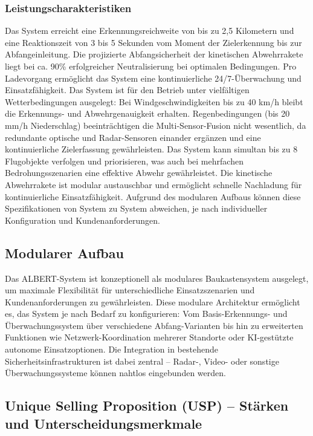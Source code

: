 \documentclass[11pt,a4paper]{article}
\begin{document}
\subsubsection*{Leistungscharakteristiken}
Das System erreicht eine Erkennungsreichweite von bis zu 2,5 Kilometern und eine Reaktionszeit von 3 bis 5 
Sekunden vom Moment der Zielerkennung bis zur Abfangeinleitung. Die projizierte Abfangsicherheit der kinetischen 
Abwehrrakete liegt bei ca. 90\% erfolgreicher Neutralisierung bei optimalen Bedingungen. Pro Ladevorgang ermöglicht 
das System eine kontinuierliche 24/7-Überwachung und Einsatzfähigkeit. Das System ist für den Betrieb 
unter vielfältigen Wetterbedingungen ausgelegt: Bei Windgeschwindigkeiten bis zu 40 km/h bleibt die Erkennungs- 
und Abwehrgenauigkeit erhalten. Regenbedingungen (bis 20 mm/h Niederschlag) beeinträchtigen die Multi-Sensor-Fusion 
nicht wesentlich, da redundante optische und Radar-Sensoren einander ergänzen und eine kontinuierliche Zielerfassung 
gewährleisten.
Das System kann simultan bis zu 8 Flugobjekte verfolgen und priorisieren, was auch bei mehrfachen 
Bedrohungsszenarien eine effektive Abwehr gewährleistet. Die kinetische Abwehrrakete ist modular austauschbar 
und ermöglicht schnelle Nachladung für kontinuierliche Einsatzfähigkeit. Aufgrund des modularen Aufbaus können 
diese Spezifikationen von System zu System abweichen, je nach individueller Konfiguration und Kundenanforderungen.

\subsection{Modularer Aufbau}

Das ALBERT-System ist konzeptionell als modulares Baukastensystem ausgelegt, um maximale Flexibilität für 
unterschiedliche Einsatzszenarien und Kundenanforderungen zu gewährleisten. Diese modulare Architektur ermöglicht 
es, das System je nach Bedarf zu konfigurieren: Vom Basis-Erkennungs- und Überwachungssystem über verschiedene 
Abfang-Varianten bis hin zu erweiterten Funktionen wie Netzwerk-Koordination mehrerer Standorte oder KI-gestützte 
autonome Einsatzoptionen. Die Integration in bestehende Sicherheitsinfrastrukturen ist dabei zentral – Radar-, 
Video- oder sonstige Überwachungssysteme können nahtlos eingebunden werden.

\subsection{Unique Selling Proposition (USP) – Stärken und Unterscheidungsmerkmale}
\end{document}
